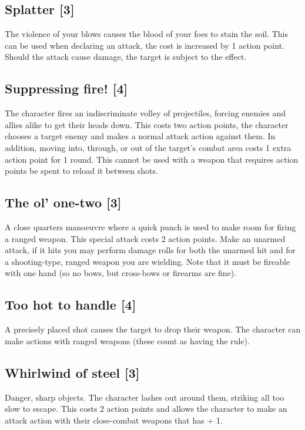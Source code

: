 \documentclass[a4paper,10pt,oneside]{book}
\newcommand{\textlf}[1]{\textbf{\titlecap{#1}}}
\begin{document}
\subsection{Splatter [3]}
The violence of your blows causes the blood of your foes to stain the soil. This can be used when declaring an attack, the cost is increased by 1 action point. Should the attack cause damage, the target is subject to the \textlf{bleeding} effect.


\subsection{Suppressing fire! [4]}
The character fires an indiscriminate volley of projectiles, forcing enemies and allies alike to get their heads down. This costs two action points, the character chooses a target enemy and makes a normal attack action against them. In addition, moving into, through, or out of the target's combat area costs 1 extra action point for 1 round. This cannot be used with a weapon that requires action points be spent to reload it between shots. 


\subsection{The ol' one-two [3]}
A close quarters manoeuvre where a quick punch is used to make room for firing a ranged weapon. This special attack costs 2 action points. Make an unarmed attack, if it hits you may perform damage rolls for both the unarmed hit and for a shooting-type, ranged weapon you are wielding. Note that it must be fireable with one hand (so no bows, but cross-bows or firearms are fine). 


\subsection{Too hot to handle [4]}
A precisely placed shot causes the target to drop their weapon. The character can make \textlf{disarm} actions with ranged weapons (these count as having the \textlf{disarm} rule).


\subsection{Whirlwind of steel [3]}
Danger, sharp objects. The character lashes out around them, striking all too slow to escape. This costs 2 action points and allows the character to make an attack action with their close-combat weapons that has \textlf{cleave} + 1.
 
\end{document}
